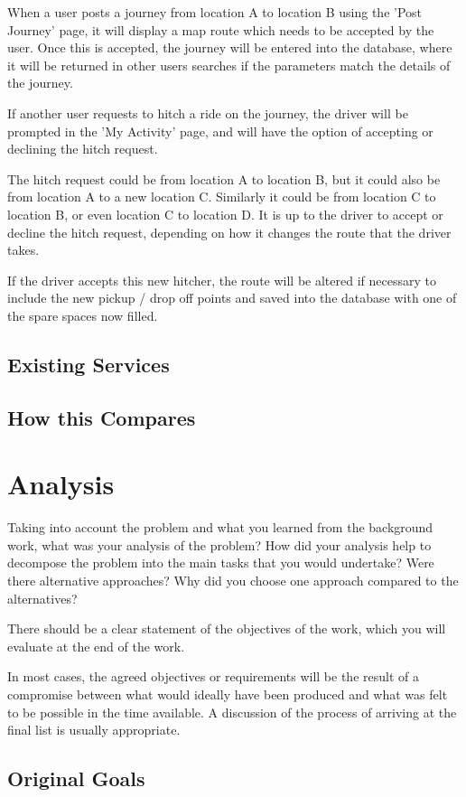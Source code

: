 	When a user posts a journey from location A to location B using the 'Post Journey' page, it will display a map route which needs to be accepted by the user. Once this is accepted, the journey will be entered into the database, where it will be returned in other users searches if the parameters match the details of the journey.
	
	If another user requests to hitch a ride on the journey, the driver will be prompted in the 'My Activity' page, and will have the option of accepting or declining the hitch request. 
	
	The hitch request could be from location A to location B, but it could also be from location A to a new location C. Similarly it could be from location C to location B, or even location C to location D. It is up to the driver to accept or decline the hitch request, depending on how it changes the route that the driver takes.
	
	If the driver accepts this new hitcher, the route will be altered if necessary to include the new pickup / drop off points and saved into the database with one of the spare spaces now filled. 
\subsection{Existing Services}
\subsection{How this Compares}

\section{Analysis}
Taking into account the problem and what you learned from the background work, what was your analysis of the problem? How did your analysis help to decompose the problem into the main tasks that you would undertake? Were there alternative approaches? Why did you choose one approach compared to the alternatives? 

There should be a clear statement of the objectives of the work, which you will evaluate at the end of the work. 

In most cases, the agreed objectives or requirements will be the result of a compromise between what would ideally have been produced and what was felt to be possible in the time available. A discussion of the process of arriving at the final list is usually appropriate.
\subsection{Original Goals}
